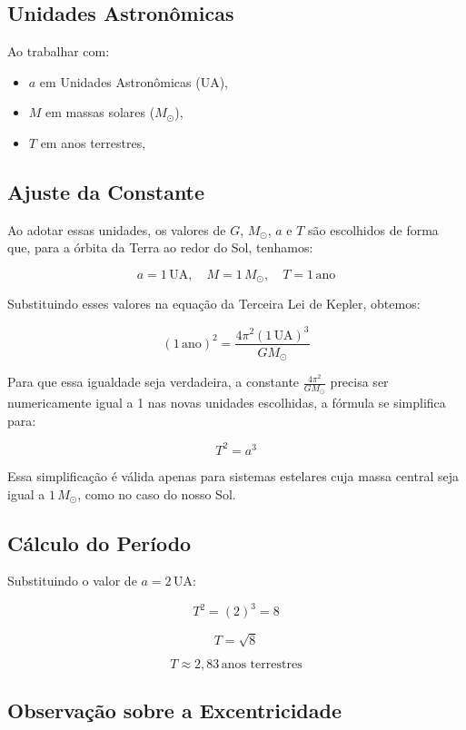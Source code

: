 \documentclass[a4paper,12pt]{article}
\begin{document}
\begin{flushleft}
\subsection*{Unidades Astronômicas}

Ao trabalhar com:

\begin{itemize}
    \item \( a \) em Unidades Astronômicas (UA),
    \item \( M \) em massas solares (\( M_{\odot} \)),
    \item \( T \) em anos terrestres,
\end{itemize}

\subsection*{Ajuste da Constante}

Ao adotar essas unidades, os valores de \(G\), \(M_{\odot}\), \(a\) e \(T\) são escolhidos de forma que, para a órbita da Terra ao redor do Sol, tenhamos:

\[
a = 1\,\text{UA}, \quad M = 1\,M_{\odot}, \quad T = 1\,\text{ano}
\]

Substituindo esses valores na equação da Terceira Lei de Kepler, obtemos:

\[
(1\,\text{ano})^2 = \frac{4\pi^2 (1\,\text{UA})^3}{G M_{\odot}}
\]

Para que essa igualdade seja verdadeira, a constante \(\frac{4\pi^2}{G M_{\odot}}\) precisa ser numericamente igual a 1 nas novas unidades escolhidas,
a fórmula se simplifica para:

\[
T^2 = a^3
\]

Essa simplificação é válida apenas para sistemas estelares cuja massa central seja igual a \(1\,M_{\odot}\), como no caso do nosso Sol.

\subsection*{Cálculo do Período}

Substituindo o valor de \(a = 2\,\text{UA}\):

\[
T^2 = (2)^3 = 8
\]

\[
T = \sqrt{8}
\]

\[
T \approx 2,83\,\text{anos terrestres}
\]

\subsection*{Observação sobre a Excentricidade}


\end{flushleft}
\end{document}
